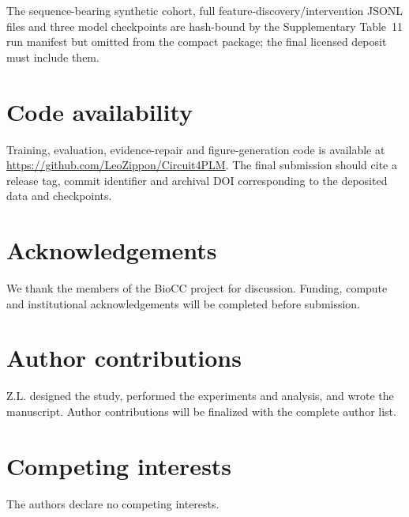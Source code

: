 \documentclass[pdflatex,sn-nature]{sn-jnl}
\begin{document}
The sequence-bearing synthetic cohort, full feature-discovery/intervention JSONL files and three model checkpoints are hash-bound by the Supplementary Table~11 run manifest but omitted from the compact package; the final licensed deposit must include them.

\section*{Code availability}

Training, evaluation, evidence-repair and figure-generation code is available at \url{https://github.com/LeoZippon/Circuit4PLM}. The final submission should cite a release tag, commit identifier and archival DOI corresponding to the deposited data and checkpoints.

\section*{Acknowledgements}

We thank the members of the BioCC project for discussion. Funding, compute and institutional acknowledgements will be completed before submission.

\section*{Author contributions}

Z.L. designed the study, performed the experiments and analysis, and wrote the manuscript. Author contributions will be finalized with the complete author list.

\section*{Competing interests}

The authors declare no competing interests.


\end{document}
